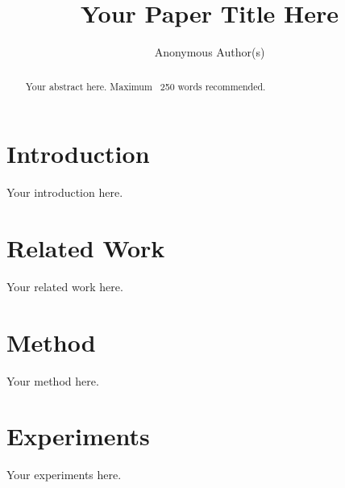 \documentclass{article}
\title{Your Paper Title Here}
\author{
  Anonymous Author(s)
}
\begin{document}
\maketitle

\begin{abstract}
Your abstract here. Maximum ~250 words recommended.
\end{abstract}

\section{Introduction}

Your introduction here.

\section{Related Work}

Your related work here.

\section{Method}

Your method here.

\section{Experiments}

Your experiments here.

\end{document}
